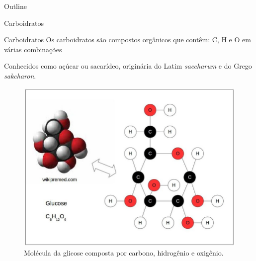 \documentclass[presentation]{beamer}
\author{fabio}
\date{\today}
\title{}
\begin{document}
\begin{frame}{Outline}
\tableofcontents
\end{frame}

\begin{frame}[label={sec:org524b6ef}]{Carboidratos}
\begin{block}{Carboidratos}
Os carboidratos são compostos orgânicos que contêm: \alert{C}, \alert{H} e \alert{O} em várias combinações

Conhecidos como açúcar ou sacarídeo, originária do Latim \emph{saccharum} e do Grego \emph{sakcharon}.

\begin{figure}[htbp]
\centering
\includegraphics[scale=0.3]{./glucose.png}
\caption{Molécula da glicose composta por carbono, hidrogênio e oxigênio.}
\end{figure}
\end{block}






\end{frame}
\end{document}

